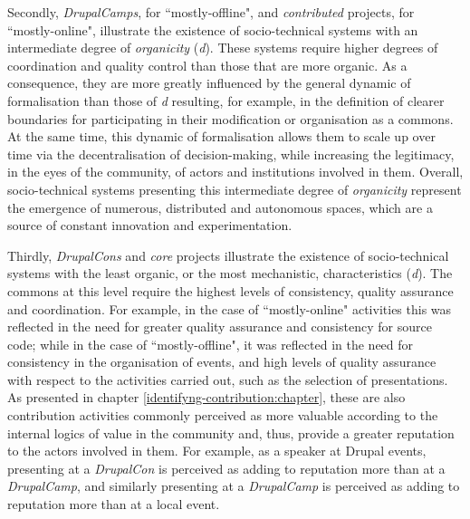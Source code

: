 Secondly, \textit{DrupalCamps}, for ``mostly-offline",  and \textit{contributed} projects, for ``mostly-online", illustrate the existence of socio-technical systems with an intermediate degree of \textit{organicity} (\textsl{d}). These systems require higher degrees of coordination and quality control than those that are more organic. As a consequence, they are more greatly influenced by the general dynamic of formalisation than those of \textsl{d} resulting, for example, in the definition of clearer boundaries for participating in their modification or organisation as a commons. At the same time, this dynamic of formalisation allows them to scale up over time via the decentralisation of decision-making, while increasing the legitimacy, in the eyes of the community, of actors and institutions involved in them. Overall, socio-technical systems presenting this intermediate degree of \textit{organicity} represent the emergence of numerous, distributed and autonomous spaces, which are a source of constant innovation and experimentation.

Thirdly, \textit{DrupalCons} and \textit{core} projects illustrate the existence of socio-technical systems with the least organic, or the most mechanistic, characteristics (\textsl{d}). The commons at this level require the highest levels of consistency, quality assurance and coordination. For example, in the case of ``mostly-online" activities this was reflected in the need for greater quality assurance and consistency for source code; while in the case of ``mostly-offline", it was reflected in the need for consistency in the organisation of events, and high levels of quality assurance with respect to the activities carried out, such as the selection of presentations. As presented in chapter \ref{identifyng-contribution:chapter}, these are also contribution activities commonly perceived as more valuable according to the internal logics of value in the community and, thus, provide a greater reputation to the actors involved in them. For example, as a speaker at Drupal events, presenting at a \textit{DrupalCon} is perceived as adding to reputation more than at a \textit{DrupalCamp}, and similarly presenting at a \textit{DrupalCamp} is perceived as adding to reputation more than at a local event.

